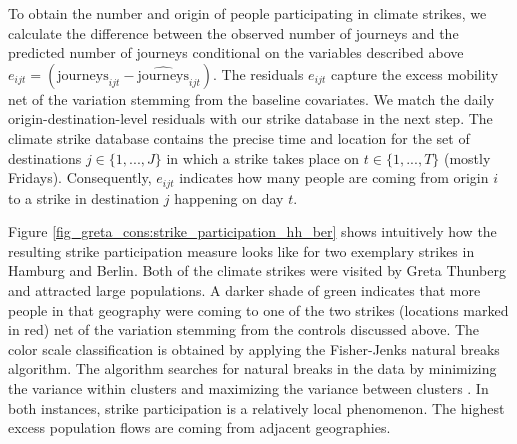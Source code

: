 To obtain the number and origin of people participating in climate strikes, we calculate the difference between the observed number of journeys and the predicted number of journeys conditional on the variables described above $e_{ijt} =(\text{journeys}_{ijt} - \widehat{\text{journeys}}_{ijt})$. The residuals $e_{ijt}$ capture the excess mobility net of the variation stemming from the baseline covariates. We match the daily origin-destination-level residuals with our strike database in the next step. The climate strike database contains the precise time and location for the set of destinations $j\in\{1,...,J\}$ in which a strike takes place on $t\in\{1,...,T\}$ (mostly Fridays). Consequently, $e_{ijt}$ indicates how many people are coming from origin $i$ to a strike in destination $j$ happening on day $t$. 


Figure \ref{fig_greta_cons:strike_participation_hh_ber} shows intuitively how the resulting strike participation measure looks like for two exemplary strikes in Hamburg and Berlin. Both of the climate strikes were visited by Greta Thunberg and attracted large populations. A darker shade of green indicates that more people in that geography were coming to one of the two strikes (locations marked in red) net of the variation stemming from the controls discussed above. The color scale classification is obtained by applying the Fisher-Jenks natural breaks algorithm. The algorithm searches for natural breaks in the data by minimizing the variance within clusters and maximizing the variance between clusters \citep{jenks1967data}. In both instances, strike participation is a relatively local phenomenon. The highest excess population flows are coming from adjacent geographies.



\afterpage{}


